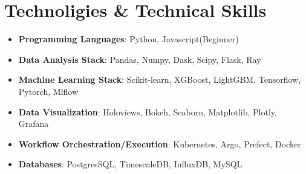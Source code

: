 \documentclass[letterpaper,11pt]{article}
\newcommand{\resumeItem}[2]{
  \item\small{
    \textbf{#1}{: #2 \vspace{-2pt}}
  }
}
\newcommand{\resumeSubItem}[2]{\resumeItem{#1}{#2}\vspace{-4pt}}
\newcommand{\resumeSubHeadingListStart}{\begin{itemize}[leftmargin=*]}
\newcommand{\resumeSubHeadingListEnd}{\end{itemize}}
\begin{document}
\section{Technoligies \& Technical Skills}
  \resumeSubHeadingListStart
    \resumeSubItem{Programming Languages}{Python, Javascript(Beginner)}
    \resumeSubItem{Data Analysis Stack}{Pandas, Numpy, Dask, Scipy, Flask, Ray}
    \resumeSubItem{Machine Learning Stack}{Scikit-learn, XGBoost, LightGBM, Tensorflow, Pytorch, Mlflow}
    \resumeSubItem{Data Visualization}{Holoviews, Bokeh, Seaborn, Matplotlib, Plotly, Grafana}
    \resumeSubItem{Workflow Orchestration/Execution}{Kubernetes, Argo, Prefect, Docker}
    \resumeSubItem{Databases}{PostgresSQL, TimescaleDB, InfluxDB, MySQL}
  \resumeSubHeadingListEnd
\end{document}
